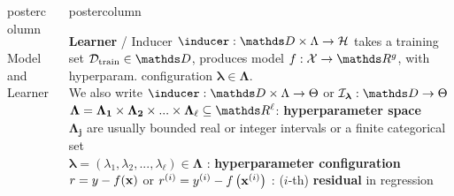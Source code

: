 \documentclass{beamer}
\begin{document}
\begin{frame}[fragile]{}
\begin{columns}
\begin{column}{.31\textwidth}
\begin{beamercolorbox}[center]{postercolumn}
\begin{minipage}{.98\textwidth}
{\begin{myblock}{Model and Learner}
\end{myblock}\vfill
				}
			\end{minipage}
		\end{beamercolorbox}
	\end{column}
	\begin{column}{.31\textwidth}
		\begin{beamercolorbox}[center]{postercolumn}
			\begin{minipage}{.98\textwidth}
				\parbox[t][\columnheight]{\textwidth}{
\begin{myblock}{} \vspace{-4ex}

\textbf{Learner} / Inducer $\inducer: \preimageInducerShort \rightarrow \Hspace$  takes a training set  $\Dtrain \in \allDatasets$, produces model $f : \Xspace \rightarrow \R^g$, with hyperparam. configuration $\bm{\lambda} \in \bm{\Lambda}$.\\
We also write $\inducer: \preimageInducerShort \rightarrow \Theta$ or $\ind_{\bm{\lambda} }: \allDatasets \rightarrow \Theta$ \\

$\bm{\Lambda} = \bm{\Lambda_1} \times \bm{\Lambda_2} \times ... \times \bm{\Lambda_}{\ell} \subseteq \R^{\ell}$: %
\textbf{hyperparameter space} \\
$\bm{\Lambda_j} $ are usually bounded real or integer intervals or a finite categorical set\\

$\bm{\lambda} = (\lambda_1, \lambda_2, ..., \lambda_{\ell}) \in \bm{\Lambda}$ : \textbf{hyperparameter configuration} \\




$r = y - f(\mathbf{x})$ or $r^{(i)} = y^{(i)} - f\left(\mathbf{x}^{(i)}\right)$ : ($i$-th) \textbf{residual} in regression\\


\end{myblock}}
\end{minipage}
\end{beamercolorbox}
\end{column}
\end{columns}
\end{frame}
\end{document}
